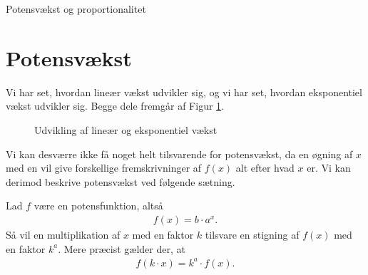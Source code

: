 \begin{center}
\Huge
Potensvækst og proportionalitet
\end{center}

\section*{Potensvækst}
Vi har set, hvordan lineær vækst udvikler sig, og vi har set, hvordan eksponentiel vækst udvikler sig. Begge dele fremgår af Figur \ref{fig:lineks}.
\begin{figure}[H]
\centering
{}
\caption{Udvikling af lineær og eksponentiel vækst}
\label{fig:lineks}
\end{figure}
Vi kan desværre ikke få noget helt tilsvarende for potensvækst, da en øgning af $x$ med en vil give forskellige fremskrivninger af $f(x)$ alt efter hvad $x$ er. Vi kan derimod beskrive potensvækst ved følgende sætning.
\begin{setn}
Lad $f$ være en potensfunktion, altså 
\begin{align*}
f(x) = b\cdot a^x.
\end{align*}
Så vil en multiplikation af $x$ med en faktor $k$ tilsvare en stigning af $f(x)$ med en faktor $k^a$. Mere præcist gælder der, at 
\begin{align*}
f(k\cdot x) = k^a\cdot f(x).
\end{align*}
\end{setn}
